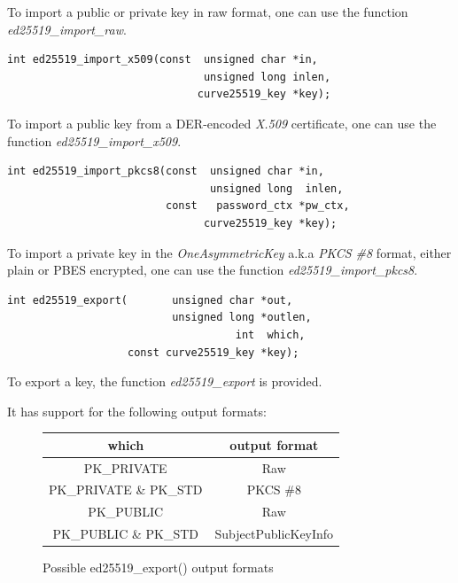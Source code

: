\documentclass[synpaper]{book}
\begin{document}
To import a public or private key in raw format, one can use the function \textit{ed25519\_import\_raw}.

\begin{verbatim}
int ed25519_import_x509(const  unsigned char *in,
                               unsigned long inlen,
                              curve25519_key *key);
\end{verbatim}

To import a public key from a DER-encoded \textit{X.509} certificate, one can use the function \textit{ed25519\_import\_x509}.

\begin{verbatim}
int ed25519_import_pkcs8(const  unsigned char *in,
                                unsigned long  inlen,
                         const   password_ctx *pw_ctx,
                               curve25519_key *key);
\end{verbatim}

To import a private key in the \textit{OneAsymmetricKey} a.k.a \textit{PKCS \#8} format, either plain or PBES encrypted,
one can use the function \textit{ed25519\_import\_pkcs8}.

\begin{verbatim}
int ed25519_export(       unsigned char *out,
                          unsigned long *outlen,
                                    int  which,
                   const curve25519_key *key);
\end{verbatim}

To export a key, the function \textit{ed25519\_export} is provided.

It has support for the following output formats:

\begin{figure}[H]
\begin{center}
\begin{tabular}{|c|c|}
\hline \textbf{which} & \textbf{output format} \\
\hline PK\_PRIVATE & Raw \\
\hline PK\_PRIVATE \& PK\_STD & PKCS \#8 \\
\hline PK\_PUBLIC & Raw \\
\hline PK\_PUBLIC \& PK\_STD & SubjectPublicKeyInfo \\
\hline
\end{tabular}
\end{center}
\caption{Possible ed25519\_export() output formats}
\end{figure}
\end{document}
